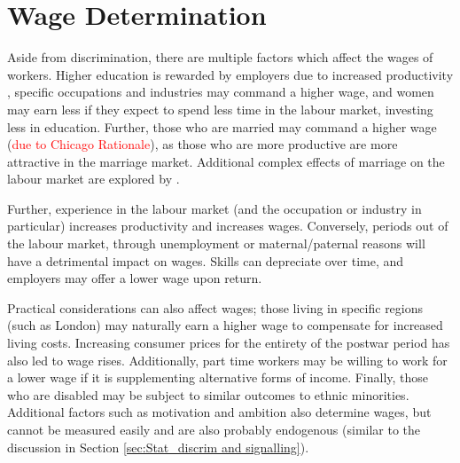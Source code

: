 \documentclass[class=article, crop=false]{standalone}
\begin{document}
\section{Wage Determination}
Aside from discrimination, there are multiple factors which affect the wages of workers. Higher education is rewarded by employers due to increased productivity \citep{Becker}, specific occupations and industries may command a higher wage, and women may earn less if they expect to spend less time in the labour market, investing less in education. Further, those who are married may command a higher wage (\textcolor{red}{due to Chicago Rationale}), as those who are more productive are more attractive in the marriage market. Additional complex effects of marriage on the labour market are explored by \citep{Ahituv}. 

Further, experience in the labour market (and the occupation or industry in particular) increases productivity and increases wages. Conversely, periods out of the labour market, through unemployment or maternal/paternal reasons will have a detrimental impact on wages. Skills can depreciate over time, and employers may offer a lower wage upon return. 

Practical considerations can also affect wages; those living in specific regions (such as London) may naturally earn a higher wage to compensate for increased living costs. Increasing consumer prices for the entirety of the postwar period \citep{WorldBank} has also led to wage rises. Additionally, part time workers may be willing to work for a lower wage if it is supplementing alternative forms of income. Finally, those who are disabled may be subject to similar outcomes to ethnic minorities. Additional factors such as motivation and ambition also determine wages, but cannot be measured easily and are also probably endogenous (similar to the discussion in Section \ref{sec:Stat_discrim and signalling}). 

\ifstandalone

\fi
\end{document}
